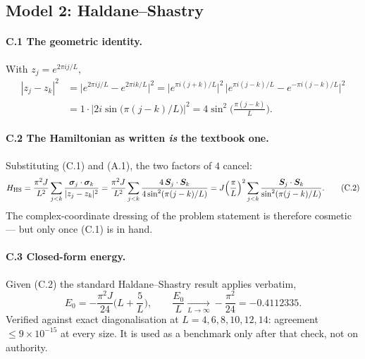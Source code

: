 \subsection{Model 2: Haldane--Shastry}

\paragraph{\textsf{C.1} The geometric identity.}
With $z_j=e^{2\pi i j/L}$,
\begin{align}
  |z_j-z_k|^2
  &= \big|e^{2\pi ij/L}-e^{2\pi ik/L}\big|^2
   = \big|e^{\pi i(j+k)/L}\big|^2\,
     \big|e^{\pi i(j-k)/L}-e^{-\pi i(j-k)/L}\big|^2 \nonumber\\
  &= 1\cdot\big|2i\sin\big(\pi(j-k)/L\big)\big|^2
   = 4\sin^2\!\Big(\frac{\pi(j-k)}{L}\Big).
  \tag{C.1}
\end{align}

\paragraph{\textsf{C.2} The Hamiltonian as written \emph{is} the textbook one.}
Substituting (C.1) and (A.1), the two factors of $4$ cancel:
\begin{equation}
  H_{\rm HS}
  = \frac{\pi^2 J}{L^2}\sum_{j<k}\frac{\bm{\sigma}_j\cdot\bm{\sigma}_k}{|z_j-z_k|^2}
  = \frac{\pi^2 J}{L^2}\sum_{j<k}\frac{4\,\bm S_j\cdot\bm S_k}
      {4\sin^2(\pi(j-k)/L)}
  = J\Big(\frac{\pi}{L}\Big)^{2}\sum_{j<k}
      \frac{\bm S_j\cdot\bm S_k}{\sin^2(\pi(j-k)/L)} .
  \tag{C.2}
\end{equation}
The complex-coordinate dressing of the problem statement is therefore
cosmetic --- but only once (C.1) is in hand.

\paragraph{\textsf{C.3} Closed-form energy.}
Given (C.2) the standard Haldane--Shastry result applies verbatim,
\begin{equation}
  E_0 = -\frac{\pi^2 J}{24}\Big(L+\frac{5}{L}\Big),
  \qquad \frac{E_0}{L}\xrightarrow[L\to\infty]{} -\frac{\pi^2}{24}
  = -0.4112335 .
  \tag{C.3}
\end{equation}
Verified against exact diagonalisation at $L=4,6,8,10,12,14$: agreement
$\le 9\times10^{-15}$ at every size. It is used as a benchmark only after that
check, not on authority.

